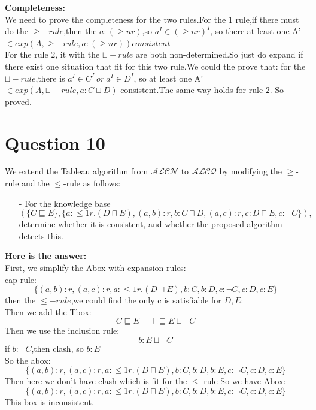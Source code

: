 \documentclass{article}
\begin{document}
    \textbf{Completeness:}\\
    We need to prove the completeness for the two rules.For the 1 rule,if there must do the $\geqslant-rule$,then the $a:(\geqslant nr)$,so $a^I \in (\geqslant nr)^I$, so there at least one A'$\in exp(A,\geqslant-rule,a:(\geqslant nr)) consistent$\\
    For the rule 2, it with the $\sqcup-rule$ are both non-determined.So just do expand if there exist one situation that fit for this two rule.We could the prove that: for the $\sqcup-rule$,there is $a^I \in C^I\ or\ a^I\in D^I$, so at least one A'$\in exp(A,\sqcup-rule,a:C\sqcup D)$ consistent.The same way holds for rule 2. So proved.\\ 

    \section{Question 10}
    We extend the Tableau algorithm from $\mathcal{ALCN}$ to $\mathcal{ALCQ}$ by modifying the $\geq$-rule and the $\leq$-rule as follows:
    \begin{itemize}
        \item[-] For the knowledge base
        \[(\{C\sqsubseteq E\}, \{a:{\leq}{1r}.(D\sqcap E), (a, b) : r, b : C\sqcap D, (a, c) : r, c: D\sqcap E, c : \neg C\}),\]determine whether it is consistent, and whether the proposed algorithm detects this.
    \end{itemize}
    \textbf{Here is the answer:}\\
    First, we simplify the Abox with expansion rules:\\
    cap rule:\\
    \[
        \{ (a, b):r,(a, c) : r, a:{\leq}{1r}.(D\sqcap E), b : C, b: D, c:\neg C,c:D,c:E\}
    \]
    then the $\leqslant-rule$,we could find the only c is satisfiable for $D,E$:\\
    Then we add the Tbox:\\
    \[
        C \sqsubseteq E = \top \sqsubseteq E\sqcup\neg C
    \]
    Then we use the inclusion rule:\\
    \[
        b:E\sqcup \neg C   
    \]
    if $b:\neg C$,then clash, so $b:E$\\
    So the abox:\\
    \[
        \{ (a, b):r,(a, c) : r, a:{\leq}{1r}.(D\sqcap E), b : C, b: D,b:E, c:\neg C,c:D,c:E\}
    \]
    Then here we don't have clash which is fit for the $\leqslant$-rule 
    So we have Abox:\\
    \[
        \{ (a, b):r,(a, c) : r, a:{\leq}{1r}.(D\sqcap E), b : C, b: D,b:E, c:\neg C,c:D,c:E\}
    \]
    This box is inconsistent.\\
\end{document}

